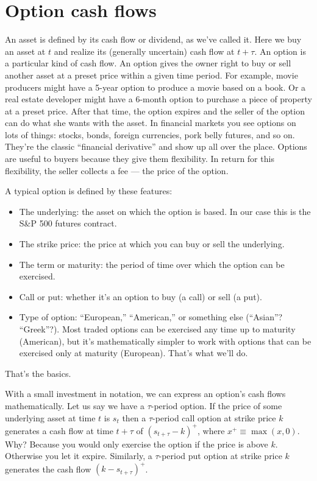 \documentclass[11pt]{article}
\begin{document}
\section{Option cash flows}

An asset is defined by its cash flow or dividend, as we've called it.
Here we buy an asset at $t$ and realize its (generally uncertain) cash flow at $t+\tau$.
An option is a particular kind of cash flow.
An option gives the owner right to buy or sell another asset at a preset price
within a given time period.
For example, movie producers might have a 5-year option to produce a
movie based on a book.
Or a real estate developer might have a 6-month option to purchase
a piece of property at a preset price.
After that time, the option expires and
the seller of the option can do what she wants with the asset.
In financial markets you see options on lots of things:  stocks, bonds,
foreign currencies, pork belly futures, and so on.
They're the classic ``financial derivative'' and show up all over the place.
Options are useful to buyers because they give them flexibility.
In return for this flexibility, the seller collects a fee --- the price
of the option.

A typical option is defined by these features:
\begin{itemize}
\item The underlying:  the asset on which the option is based.
In our case this is the S\&P 500 futures contract.
\item The strike price: the price at which you can buy or sell
the underlying.
\item The term or maturity: the period of time
over which the option can be exercised.
\item Call or put:  whether it's an option to buy (a call) or sell (a put).
\item Type of option:  ``European,'' ``American,'' or something else (``Asian''?  ``Greek''?).
Most traded options can be exercised any time up to maturity (American),
but it's mathematically simpler to work with options that can be
exercised only at maturity (European).
That's what we'll do.
\end{itemize}
That's the basics.

With a small investment in notation,
we can express an option's cash flows mathematically.
Let us say we have a $\tau$-period option.
If the price of some underlying asset at time $t$ is $s_t$
then a $\tau$-period call option at strike price $k$
generates a cash flow at time $t+\tau$ of
$ ( s_{t+\tau} - k )^+ $,
where $x^+ \equiv \max(x,0) $.
Why?  Because you would only exercise the option if the price is above $k$.
Otherwise you let it expire.
Similarly, a $\tau$-period put option at strike price $k$
generates the cash flow $ (k - s_{t+\tau} )^+ $.
\end{document}
